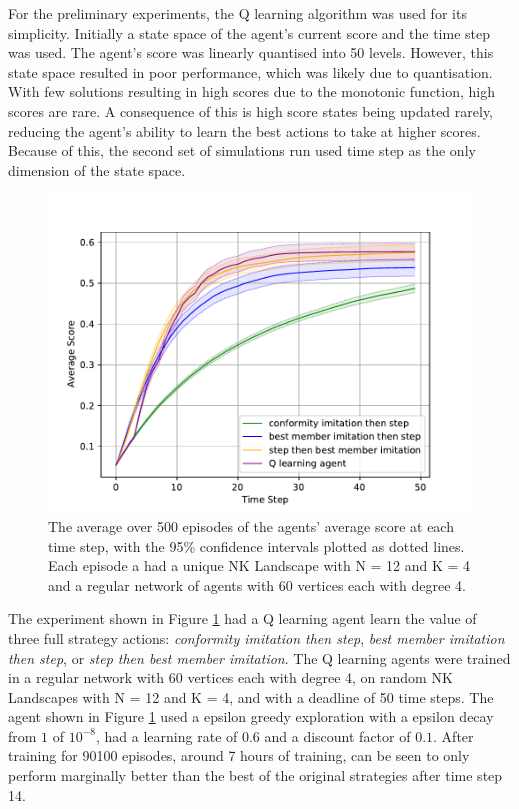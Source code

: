 \documentclass[conference]{IEEEtran}
\begin{document}
For the preliminary experiments,
the Q learning algorithm \cite{qlearning}
was used for its simplicity.
Initially a state space of the agent's current score
and the time step was used.
The agent's score was linearly quantised into 50 levels.
However, this state space resulted in poor performance,
which was likely due to quantisation.
With few solutions resulting in high scores due to the monotonic function,
high scores are rare.
A consequence of this is high score states being updated rarely,
reducing the agent's ability to learn the best actions to take at higher scores.
Because of this, the second set of simulations run used time step
as the only dimension of the state space.

\begin{figure}[htbp]
    \centering
    \centerline{\includegraphics[scale=0.6]{figures/version4.pdf}}
    \caption{
        The average over 500 episodes of the agents' average score
        at each time step, with the 95\% confidence intervals
        plotted as dotted lines.
        Each episode a had a unique NK Landscape with N = 12 and K = 4
        and a regular network of agents with 60 vertices each with degree 4.
    }
    \label{avscore}
\end{figure}

The experiment shown in Figure \ref{avscore}
had a Q learning agent learn the value of three full strategy actions:
\emph{conformity imitation then step}, \emph{best member imitation then step},
or \emph{step then best member imitation}.
The Q learning agents were trained in a regular network with 60 vertices
each with degree 4, on random NK Landscapes with N = 12 and K = 4,
and with a deadline of 50 time steps.
The agent shown in Figure \ref{avscore}
used a epsilon greedy exploration with a epsilon decay from $1$ of $10^{-8}$,
had a learning rate of $0.6$ and a discount factor of $0.1$.
After training for 90100 episodes, around 7 hours of training,
can be seen to only perform marginally better
than the best of the original strategies after time step 14.
\end{document}
